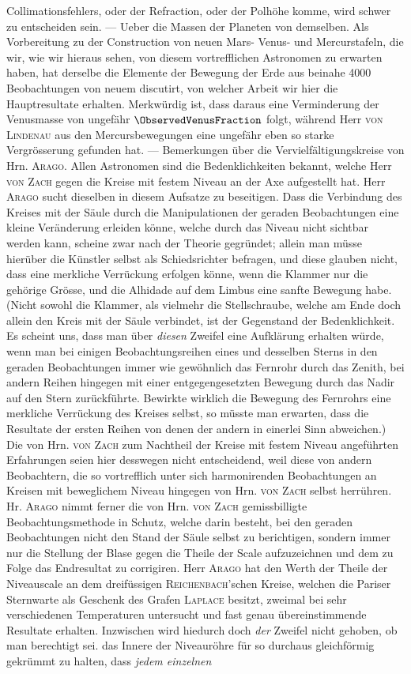 \noindent Collimationsfehlers, oder der Refraction, oder der Polhöhe komme, wird schwer zu entscheiden sein. --- Ueber die Massen der Planeten von demselben. Als Vorbereitung zu der Construction von neuen Mars- Venus- und Mercurstafeln, die wir, wie wir hieraus sehen, von diesem vortrefflichen Astronomen zu erwarten haben, hat derselbe die Elemente der Bewegung der Erde aus beinahe 4000 Beobachtungen von neuem discutirt, von welcher Arbeit wir hier die Hauptresultate erhalten. Merkwürdig ist, dass daraus eine Verminderung der Venusmasse von ungefähr $\ObservedVenusFraction$ folgt, während Herr \textsc{von Lindenau} aus den Mercursbewegungen eine ungefähr eben so starke Vergrösserung gefunden hat. --- Bemerkungen über die Vervielfältigungskreise von Hrn. \textsc{Arago}. Allen Astronomen sind die Bedenklichkeiten bekannt, welche Herr \textsc{von Zach} gegen die Kreise mit festem Niveau an der Axe aufgestellt hat. Herr \textsc{Arago} sucht dieselben in diesem Aufsatze zu beseitigen. Dass die Verbindung des Kreises mit der Säule durch die Manipulationen der geraden Beobachtungen eine kleine Veränderung erleiden könne, welche durch das Niveau nicht sichtbar werden kann, scheine zwar nach der Theorie gegründet; allein man müsse hierüber die Künstler selbst als Schiedsrichter befragen, und diese glauben nicht, dass eine merkliche Verrückung erfolgen könne, wenn die Klammer nur die gehörige Grösse, und die Alhidade auf dem Limbus eine sanfte Bewegung habe. (Nicht sowohl die Klammer, als vielmehr die Stellschraube, welche am Ende doch allein den Kreis mit der Säule verbindet, ist der Gegenstand der Bedenklichkeit. Es scheint uns, dass man über \emph{diesen} Zweifel eine Aufklärung erhalten würde, wenn man bei einigen Beobachtungsreihen eines und desselben Sterns in den geraden Beobachtungen immer wie gewöhnlich das Fernrohr durch das Zenith, bei andern Reihen hingegen mit einer entgegengesetzten Bewegung durch das Nadir auf den Stern zurückführte. Bewirkte wirklich die Bewegung des Fernrohrs eine merkliche Verrückung des Kreises selbst, so müsste man erwarten, dass die Resultate der ersten Reihen von denen der andern in einerlei Sinn abweichen.) Die von Hrn. \textsc{von Zach} zum Nachtheil der Kreise mit festem Niveau angeführten Erfahrungen seien hier desswegen nicht entscheidend, weil diese von andern Beobachtern, die so vortrefflich unter sich harmonirenden Beobachtungen an Kreisen mit beweglichem Niveau hingegen von Hrn. \textsc{von Zach} selbst herrühren. Hr. \textsc{Arago} nimmt ferner die von Hrn. \textsc{von Zach} gemissbilligte Beobachtungsmethode in Schutz, welche darin besteht, bei den geraden Beobachtungen nicht den Stand der Säule selbst zu berichtigen, sondern immer nur die Stellung der Blase gegen die Theile der Scale aufzuzeichnen und dem zu Folge das Endresultat zu corrigiren. Herr \textsc{Arago} hat den Werth der Theile der Niveauscale an dem dreifüssigen \textsc{Reichenbach}'schen Kreise, welchen die Pariser Sternwarte als Geschenk des Grafen \textsc{Laplace} besitzt, zweimal bei sehr verschiedenen Temperaturen untersucht und fast genau übereinstimmende Resultate erhalten. Inzwischen wird hiedurch doch \emph{der} Zweifel nicht gehoben, ob man berechtigt sei. das Innere der Niveauröhre für so durchaus gleichförmig gekrümmt zu halten, dass \emph{jedem einzelnen} 